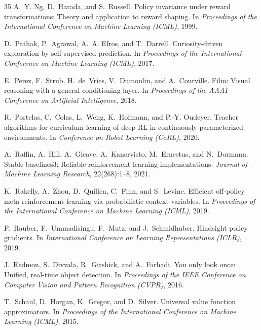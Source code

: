 \documentclass[11pt,a4paper]{article}
\begin{document}
\begin{thebibliography}{35}
A.~Y. Ng, D.~Harada, and S.~Russell.
\newblock Policy invariance under reward transformations: Theory and application to reward shaping.
\newblock In \emph{Proceedings of the International Conference on Machine Learning (ICML)}, 1999.

D.~Pathak, P.~Agrawal, A.~A. Efros, and T.~Darrell.
\newblock Curiosity-driven exploration by self-supervised prediction.
\newblock In \emph{Proceedings of the International Conference on Machine Learning (ICML)}, 2017.

E.~Perez, F.~Strub, H.~de~Vries, V.~Dumoulin, and A.~Courville.
\newblock Film: Visual reasoning with a general conditioning layer.
\newblock In \emph{Proceedings of the AAAI Conference on Artificial Intelligence}, 2018.

R.~Portelas, C.~Colas, L.~Weng, K.~Hofmann, and P.-Y. Oudeyer.
\newblock Teacher algorithms for curriculum learning of deep RL in continuously parameterized environments.
\newblock In \emph{Conference on Robot Learning (CoRL)}, 2020.

A.~Raffin, A.~Hill, A.~Gleave, A.~Kanervisto, M.~Ernestus, and N.~Dormann.
\newblock Stable-baselines3: Reliable reinforcement learning implementations.
\newblock \emph{Journal of Machine Learning Research}, 22(268):1--8, 2021.

K.~Rakelly, A.~Zhou, D.~Quillen, C.~Finn, and S.~Levine.
\newblock Efficient off-policy meta-reinforcement learning via probabilistic context variables.
\newblock In \emph{Proceedings of the International Conference on Machine Learning (ICML)}, 2019.

P.~Rauber, F.~Ummadisingu, F.~Mutz, and J.~Schmidhuber.
\newblock Hindsight policy gradients.
\newblock In \emph{International Conference on Learning Representations (ICLR)}, 2019.

J.~Redmon, S.~Divvala, R.~Girshick, and A.~Farhadi.
\newblock You only look once: Unified, real-time object detection.
\newblock In \emph{Proceedings of the IEEE Conference on Computer Vision and Pattern Recognition (CVPR)}, 2016.

T.~Schaul, D.~Horgan, K.~Gregor, and D.~Silver.
\newblock Universal value function approximators.
\newblock In \emph{Proceedings of the International Conference on Machine Learning (ICML)}, 2015.


\end{thebibliography}
\end{document}
